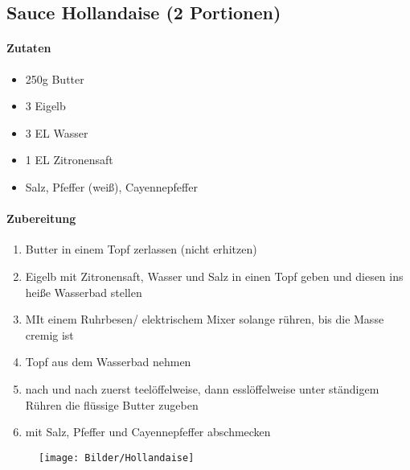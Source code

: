 \newpage
\subsection{Sauce Hollandaise (2 Portionen)}
\paragraph{Zutaten}
\begin{itemize}[noitemsep]
	\item 250g Butter
	\item 3 Eigelb
	\item 3 EL Wasser
	\item 1 EL Zitronensaft
	\item Salz, Pfeffer (weiß), Cayennepfeffer
\end{itemize}
\paragraph{Zubereitung}
\begin{enumerate}[noitemsep]
	\item Butter in einem Topf zerlassen (nicht erhitzen)
	\item  Eigelb mit Zitronensaft, Wasser und Salz in einen Topf geben und diesen ins heiße Wasserbad stellen 
	\item MIt einem Ruhrbesen/ elektrischem Mixer solange rühren, bis die Masse cremig ist
	\item Topf aus dem Wasserbad nehmen
	\item nach und nach zuerst teelöffelweise, dann esslöffelweise unter ständigem Rühren die flüssige Butter zugeben
	\item mit Salz, Pfeffer und Cayennepfeffer abschmecken
\end{enumerate}
\begin{figure}[h]
	\texttt{[image: Bilder/Hollandaise]}
\end{figure}